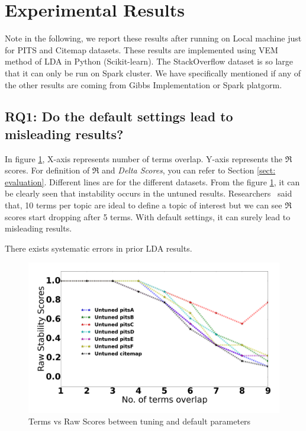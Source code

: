\documentclass[conference]{IEEEtran}
\theoremstyle{break}
\begin{document}
\section{Experimental Results}

Note in the following, we report these results after running on Local machine just for PITS and Citemap datasets. These results are implemented using VEM method of LDA in Python (Scikit-learn). The StackOverflow dataset is so large that it can only be run on Spark cluster. We have specifically mentioned if any of the other results are coming from Gibbs Implementation or Spark platgorm.

\subsection{\textbf{RQ1: Do the default settings lead to misleading results?}}

In figure \ref{fig:raw_untuned}, X-axis represents number of terms overlap. Y-axis represents the $\Re$ scores. For definition of $\Re$ and \textit{Delta Scores}, you can refer to Section \ref{sect: evaluation}. Different lines are for the different datasets. From the figure \ref{fig:raw_untuned}, it can be clearly seen that instability occurs in the untuned results. Researchers~\cite{panichella2013effectively, lukins2010bug} said that, 10 terms per topic are ideal to define a topic of interest but we can see $\Re$ scores start dropping after 5 terms. With default settings, it can surely lead to misleading results.

\begin{lesson}
There exists systematic errors in prior LDA results.
\end{lesson}


\begin{figure}[!htbp]
  \centering
  \includegraphics[width=\linewidth]{./fig/Vem_untuned.png}
  \caption{Terms vs Raw Scores between tuning and default parameters}
  \label{fig:raw_untuned}
\end{figure}
\end{document}
